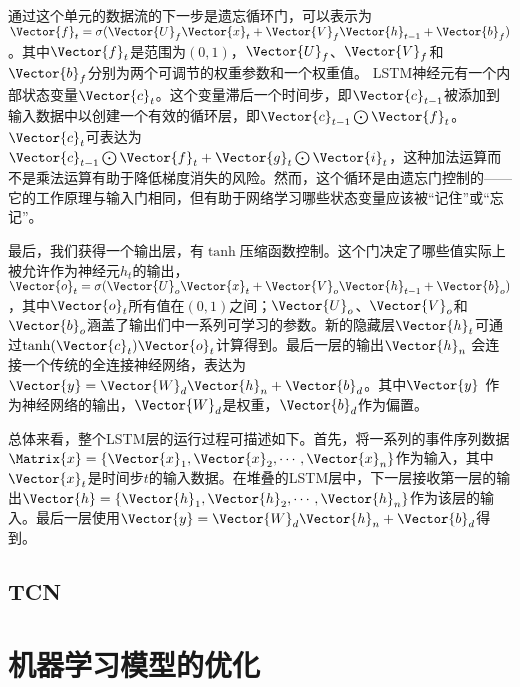 通过这个单元的数据流的下一步是遗忘循环门，可以表示为$\Vector{f}_t=\sigma(\Vector{U}_f\Vector{x}_t+\Vector{V}_f\Vector{h}_{t-1}+\Vector{b}_f)$。其中$\Vector{f}_t$是范围为$(0,1)$，$\Vector{U}_f$、$\Vector{V}_f$和$\Vector{b}_f$分别为两个可调节的权重参数和一个权重值。
LSTM神经元有一个内部状态变量$\Vector{c}_t$。这个变量滞后一个时间步，即$\Vector{c}_{t-1}$被添加到输入数据中以创建一个有效的循环层，即$\Vector{c}_{t-1}\bigodot\Vector{f}_t$。$\Vector{c}_t$可表达为$\Vector{c}_{t-1}\bigodot\Vector{f}_t+\Vector{g}_t\bigodot\Vector{i}_t$，这种加法运算而不是乘法运算有助于降低梯度消失的风险。然而，这个循环是由遗忘门控制的——它的工作原理与输入门相同，但有助于网络学习哪些状态变量应该被``记住''或``忘记''。

最后，我们获得一个输出层，有$\tanh$压缩函数控制。这个门决定了哪些值实际上被允许作为神经元$h_t$的输出，$\Vector{o}_t=\sigma(\Vector{U}_o\Vector{x}_t+\Vector{V}_o\Vector{h}_{t-1}+\Vector{b}_o)$，其中$\Vector{o}_t$所有值在$(0,1)$之间；$\Vector{U}_o$、$\Vector{V}_o$和$\Vector{b}_o$涵盖了输出们中一系列可学习的参数。新的隐藏层$\Vector{h}_t$可通过$\tanh(\Vector{c}_t)\Vector{o}_t$计算得到。最后一层的输出$\Vector{h}_n$
会连接一个传统的全连接神经网络，表达为$\Vector{y}=\Vector{W}_d \Vector{h}_n+\Vector{b}_d$。其中$\Vector{y}$ 作为神经网络的输出，$\Vector{W}_d$是权重，$\Vector{b}_d$作为偏置。

总体来看，整个LSTM层的运行过程可描述如下。首先，将一系列的事件序列数据$\Matrix{x}=\{\Vector{x}_1,\Vector{x}_2,\cdots,\Vector{x}_n\}$作为输入，其中$\Vector{x}_t$是时间步$t$的输入数据。在堆叠的LSTM层中，下一层接收第一层的输出$\Vector{h}=\{\Vector{h}_1,\Vector{h}_2,\cdots,\Vector{h}_n\}$作为该层的输入。最后一层使用$\Vector{y}=\Vector{W}_d\Vector{h}_n+\Vector{b}_d$得到。

\subsection{TCN}\label{sec:TCN}

\section{机器学习模型的优化}\label{sec:机器学习模型的优化}

